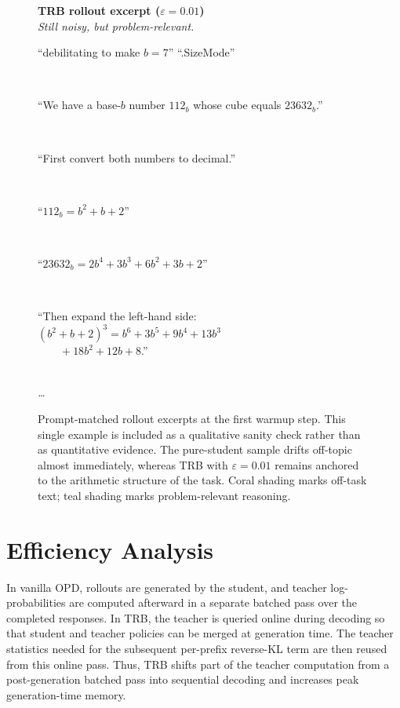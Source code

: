 \documentclass{llmxive}
\providecommand{\TRbadblock}[1]{\colorbox{TRBadBg}{\parbox{\dimexpr\linewidth-2\fboxsep\relax}{#1}}}
\providecommand{\TRgoodblock}[1]{\colorbox{TRGoodBg}{\parbox{\dimexpr\linewidth-2\fboxsep\relax}{#1}}}
\begin{document}
\begin{figure}[t!]
\begin{minipage}{0.96\textwidth}
\begin{minipage}[t]{0.49\linewidth}
{{\large\textbf{TRB rollout excerpt ($\varepsilon=0.01$)}\\[0.3em]
\textit{Still noisy, but problem-relevant.}\\[0.25em]
\footnotesize
\TRbadblock{``debilitating to make $b=7$'' \quad ``.SizeMode''}\\[0.22em]
\TRgoodblock{``We have a base-$b$ number $112_b$ whose cube equals $23632_b$.''}\\[0.22em]
\TRgoodblock{``First convert both numbers to decimal.''}\\[0.22em]
\TRgoodblock{``$112_b = b^2 + b + 2$''}\\[0.22em]
\TRgoodblock{``$23632_b = 2b^4 + 3b^3 + 6b^2 + 3b + 2$''}\\[0.22em]
\TRgoodblock{``Then expand the left-hand side: $(b^2+b+2)^3 = b^6+3b^5+9b^4+13b^3$\\
$\qquad +18b^2+12b+8$.''}\\[0.22em]
\textit{\ldots}
}
}
\end{minipage}

\end{minipage}
\endgroup

\caption{Prompt-matched rollout excerpts at the first warmup step. This single example is included as a qualitative sanity check rather than as quantitative evidence. The pure-student sample drifts off-topic almost immediately, whereas TRB with $\varepsilon=0.01$ remains anchored to the arithmetic structure of the task. Coral shading marks off-task text; teal shading marks problem-relevant reasoning.}
\label{fig:rollout-excerpts}
\end{figure}

\section{Efficiency Analysis}
\label{app:efficiency}

In vanilla OPD, rollouts are generated by the student, and teacher log-probabilities are computed afterward in a separate batched pass over the completed responses.
In TRB, the teacher is queried online during decoding so that student and teacher policies can be merged at generation time.
The teacher statistics needed for the subsequent per-prefix reverse-KL term are then reused from this online pass.
Thus, TRB shifts part of the teacher computation from a post-generation batched pass into sequential decoding and increases peak generation-time memory.
\end{document}
